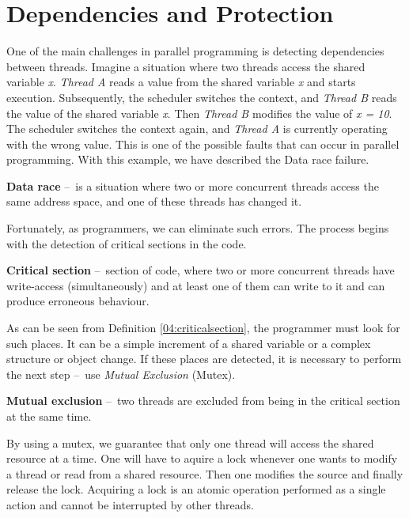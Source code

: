 \section{Dependencies and Protection}
\label{dependenciesandprotection}

One of the main challenges in parallel programming is detecting dependencies between threads.
Imagine a situation where two threads access the shared variable \emph{x}. \emph{Thread A} reads a value from the shared variable \emph{x} and starts execution.
Subsequently, the scheduler switches the context, and \emph{Thread B} reads the value of the shared variable \emph{x}. Then \emph{Thread B} modifies the value of \emph{x = 10}.
The scheduler switches the context again, and \emph{Thread A} is currently operating with the wrong value.
This is one of the possible faults that can occur in parallel programming.
With this example, we have described the Data race failure.

\begin{definition}
    \textbf{Data race} \---\ is a situation where two or more concurrent threads access the same address space, and one of these threads has changed it.
\end{definition}
Fortunately, as programmers, we can eliminate such errors.
The process begins with the detection of critical sections in the code.
\begin{definition}
    \label{04:criticalsection}
    \textbf{Critical section} \---\ section of code, where two or more concurrent threads have write-access (simultaneously) and at least one of them can write to it and can produce erroneous behaviour.
\end{definition}
As can be seen from Definition \ref{04:criticalsection}, the programmer must look for such places.
It can be a simple increment of a shared variable or a complex structure or object change.
If these places are detected, it is necessary to perform the next step \---\ use \emph{Mutual Exclusion} (Mutex).
\begin {definition}
    \textbf{Mutual exclusion} \---\ two threads are excluded from being in the critical section at the same time.
\end {definition}
By using a mutex, we guarantee that only one thread will access the shared resource at a time.
One will have to aquire a lock whenever one wants to modify a thread or read from a shared resource.
Then one modifies the source and finally release the lock.
Acquiring a lock is an atomic operation performed as a single action and cannot be interrupted by other threads.

